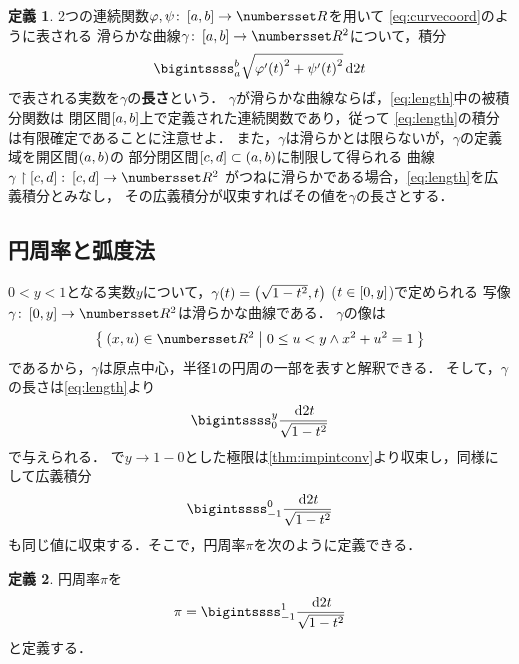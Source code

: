 \documentclass[11pt,a4paper]{ltjsarticle}
\newcommand*{\definition}[1]{\textbf{#1}}
\newcommand*{\coord}[1]{\paren{#1}}
\newcommand*{\intd}{\dl2}
\newcommand*{\restrict}{\upharpoonright}
\theoremstyle{definition}
\newtheorem{dfn}{定義}[section]
\begin{document}
\begin{dfn} \label{dfn:length}
  2つの連続関数$\varphi, \psi \colon \interval{c}{a,b} \to \Real$を用いて
  \cref{eq:curvecoord}のように表される
  滑らかな曲線$\gamma \colon \interval{c}{a,b} \to \Real^2$について，積分
  \begin{align}
    \bigintssss_a^b \sqrt{ \apply{\varphi '}{t}^2 + \apply{\psi '}{t}^2} \intd t
    \label{eq:length}
  \end{align}
  で表される実数を$\gamma$の\definition{長さ}という．
  $\gamma$が滑らかな曲線ならば，\cref{eq:length}中の被積分関数は
  閉区間$\interval{c}{a,b}$上で定義された連続関数であり，従って
  \cref{eq:length}の積分は有限確定であることに注意せよ．
  また，$\gamma$は滑らかとは限らないが，$\gamma$の定義域を開区間$\interval{op}{a,b}$の
  部分閉区間$\interval{c}{c,d} \subset \interval{op}{a,b}$に制限して得られる
  曲線$\gamma \restrict \interval{c}{c,d} \colon \interval{c}{c,d} \to \Real^2$
  がつねに滑らかである場合，\cref{eq:length}を広義積分とみなし，
  その広義積分が収束すればその値を$\gamma$の長さとする．
\end{dfn}


\subsection{円周率と弧度法} \label{subsec:pi}


$0 < y < 1$となる実数$y$について，$\apply{\gamma}{t} = \coord{\sqrt{1 - t^2}, t}$ ($t \in \interval{c}{0,y}$)で定められる
写像$\gamma \colon \interval{c}{0,y} \to \Real^2$は滑らかな曲線である．
$\gamma$の像は
\begin{align}
  \setintension{\coord{x,u} \in \Real^2}{0 \leq u < y \land x^2 + u^2 = 1}
  \label{eq:circle}
\end{align}
であるから，$\gamma$は原点中心，半径1の円周の一部を表すと解釈できる．
そして，$\gamma$の長さは\cref{eq:length}より
\begin{align}
  \bigintssss_0^y \frac{\intd t}{\sqrt{1 - t^2}}
  \label{eq:arc}
\end{align}
で与えられる．
で$y \to 1 - 0$とした極限は\cref{thm:impintconv}より収束し，同様にして広義積分
\begin{align}
  \bigintssss_{-1}^0 \frac{\intd t}{\sqrt{1 - t^2}}
  \label{eq:arc-1}
\end{align}
も同じ値に収束する．そこで，円周率$\pi$を次のように定義できる．

\begin{dfn} \label{dfn:pi}
  円周率$\pi$を
  \begin{align}
    \pi = \bigintssss_{-1}^1 \frac{\intd t}{\sqrt{1 - t^2}}
    \label{eq:pi}
  \end{align}
  と定義する．
\end{dfn}
\end{document}
